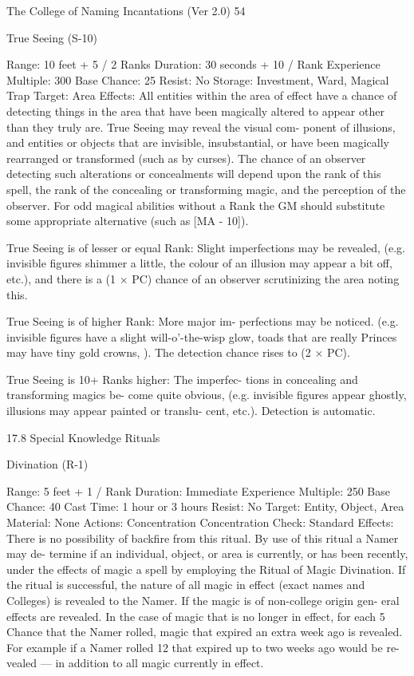 \begin{Chapter}{The College of Naming Incantations (Ver 2.0)}
54 

True Seeing (S-10) 

Range: 10 feet + 5 / 2 Ranks 
Duration: 30 seconds + 10 / Rank 
Experience Multiple: 300 
Base Chance: 25%
Resist: No 
Storage: Investment, Ward, Magical Trap 
Target: Area 
Effects: All entities within the area of effect have a 
chance  of  detecting  things  in  the  area  that  have 
been  magically  altered  to  appear  other  than  they 
truly  are.  True  Seeing  may  reveal  the  visual  com-
ponent  of  illusions, and  entities  or  objects  that  are 
invisible,  insubstantial,  or  have  been  magically 
rearranged or transformed (such as by curses). The 
chance of an observer detecting such alterations or 
concealments  will  depend  upon  the  rank  of  this 
spell,  the  rank  of  the  concealing  or  transforming 
magic, and the perception of the observer. For odd 
magical  abilities  without  a  Rank  the  GM  should 
substitute  some  appropriate  alternative  (such  as 
[MA - 10]). 

True  Seeing  is  of  lesser  or  equal  Rank:  Slight 
imperfections  may  be  revealed,  (e.g.  invisible 
figures  shimmer  a  little,  the  colour  of  an  illusion 
may appear a bit off, etc.), and there is a (1 × PC) 
chance  of  an  observer  scrutinizing  the  area  noting 
this. 

True  Seeing  is  of  higher  Rank:  More  major  im-
perfections  may  be  noticed.  (e.g.  invisible  figures 
have  a  slight  will-o’-the-wisp  glow,  toads  that  are 
really  Princes  may  have  tiny  gold  crowns,  ).  The 
detection chance rises to (2 × PC). 

True Seeing is 10+ Ranks higher: The imperfec-
tions  in  concealing  and  transforming  magics  be-
come  quite  obvious,  (e.g.  invisible  figures  appear 
ghostly,  illusions  may  appear  painted  or  translu-
cent, etc.). Detection is automatic. 

17.8 Special Knowledge Rituals 

Divination (R-1) 

Range: 5 feet + 1 / Rank 
Duration: Immediate 
Experience Multiple: 250 
Base Chance: 40%
Cast Time: 1 hour or 3 hours 
Resist: No 
Target: Entity, Object, Area 
Material: None 
Actions: Concentration 
Concentration Check: Standard 
Effects:  There  is  no  possibility  of  backfire  from 
this  ritual.  By  use  of  this  ritual  a  Namer  may  de-
termine if an individual, object, or area is currently, 
or  has  been  recently,  under  the  effects  of  magic  a 
spell by employing the Ritual of Magic Divination. 
If the ritual is successful, the nature of all magic in 
effect (exact names and Colleges) is revealed to the 
Namer.  If  the  magic  is  of  non-college  origin  gen-
eral  effects  are  revealed.  In  the  case  of  magic  that 
is  no  longer  in  effect,  for  each  5%
Chance  that  the  Namer  rolled,  magic  that  expired 
an  extra  week  ago  is  revealed.  For  example  if  a 
Namer  rolled  12%
that  expired  up  to  two  weeks  ago  would  be  re-
vealed  —  in  addition  to  all  magic  currently  in 
effect. 


\end{Chapter}
